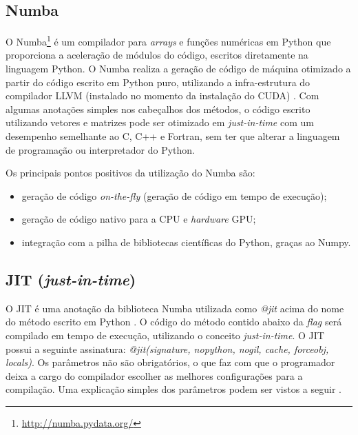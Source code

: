 \documentclass[
	12pt,				%
	twoside,			%
	a4paper,			%
	english,			%
	french,				%
	spanish,			%
	brazil				%
	]{abntex2}
\begin{document}
\subsection{Numba}\label{numba}

O Numba\footnote{\url{http://numba.pydata.org/}} é um compilador para
\emph{arrays} e funções numéricas em Python que proporciona a aceleração
de módulos do código, escritos diretamente na linguagem Python. O Numba
realiza a geração de código de máquina otimizado a partir do código
escrito em Python puro, utilizando a infra-estrutura do compilador LLVM
(instalado no momento da instalação do CUDA) \cite{LAM}. Com algumas
anotações simples nos cabeçalhos dos métodos, o código escrito
utilizando vetores e matrizes pode ser otimizado em \emph{just-in-time}
com um desempenho semelhante ao C, C++ e Fortran, sem ter que alterar a
linguagem de programação ou interpretador do Python.

Os principais pontos positivos da utilização do Numba são:

\begin{itemize}
\item
  geração de código \emph{on-the-fly} (geração de código em tempo de
  execução);
\item
  geração de código nativo para a CPU e \emph{hardware} GPU;
\item
  integração com a pilha de bibliotecas científicas do Python, graças ao
  Numpy.
\end{itemize}

\subsection{\texorpdfstring{JIT
(\emph{just-in-time})}{JIT (just-in-time)}}\label{jit-just-in-time}

O JIT é uma anotação da biblioteca Numba utilizada como \emph{@jit}
acima do nome do método escrito em Python \cite{RIGO}. O código do
método contido abaixo da \emph{flag} será compilado em tempo de
execução, utilizando o conceito \emph{just-in-time}. O JIT possui a
seguinte assinatura: \emph{@jit(signature, nopython, nogil, cache,
forceobj, locals)}. Os parâmetros não são obrigatórios, o que faz com
que o programador deixa a cargo do compilador escolher as melhores
configurações para a compilação. Uma explicação simples dos parâmetros
podem ser vistos a seguir \cite{NUMBA}.
\end{document}
